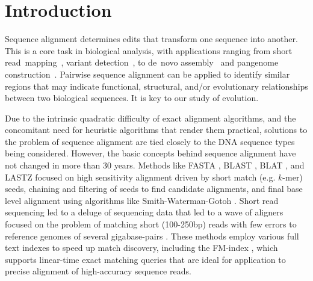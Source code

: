 \documentclass{bioinfo}
\theoremstyle{definition}
\begin{document}
\maketitle

\section{Introduction}
\label{sec:introduction}
Sequence alignment determines edits that transform one sequence into another.
This is a core task in biological analysis, with applications ranging from short read~mapping~\citep{Langmead2012, li2013aligning, MarcoSola2012}, variant detection~\citep{DePristo2011}, to de~novo assembly~\citep{Simpson2009} and pangenome construction~\citep{Armstrong2020, Li2020, pggb}.
Pairwise sequence alignment can be applied to identify similar regions that may indicate functional, structural, and/or evolutionary relationships between two biological sequences.
It is key to our study of evolution.

Due to the intrinsic quadratic difficulty of exact alignment algorithms, and the concomitant need for heuristic algorithms that render them practical, solutions to the problem of sequence alignment are tied closely to the DNA sequence types being considered.
However, the basic concepts behind sequence alignment have not changed in more than 30 years.
Methods like FASTA \citep{Pearson_1988}, BLAST \citep{Altschul_1990}, BLAT \citep{Kent_2002}, and LASTZ \citep{harris2007lastz} focused on high sensitivity alignment driven by short match (e.g. $k$-mer) seeds, chaining and filtering of seeds to find candidate alignments, and final base level alignment using algorithms like Smith-Waterman-Gotoh \citep{Gotoh_1982}.
Short read sequencing led to a deluge of sequencing data that led to a wave of aligners focused on the problem of matching short (100-250bp) reads with few errors to reference genomes of several gigabase-pairs \cite{Langmead2012,MarcoSola2012,li2013aligning}.
These methods employ various full text indexes to speed up match discovery, including the FM-index \citep{Ferragina_2000}, which supports linear-time exact matching queries that are ideal for application to precise alignment of high-accuracy sequence reads.
\end{document}
